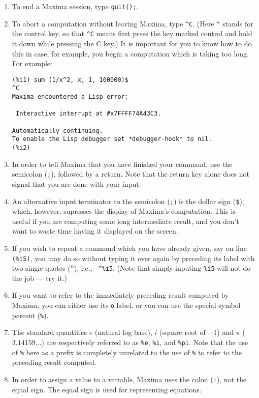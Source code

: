 \documentclass[a4paper,12pt]{article}
\begin{document}
\begin{enumerate}
\item To end a Maxima session, type {\tt quit();}.

\item To abort a computation without leaving Maxima, type \verb+^C+.
(Here \verb+^+ stands for the control key, so
that \verb+^C+ means first press the key marked control and hold it down while pressing the C key.)
It is important for you to
know how to do this in case, for example, you begin a computation which is taking too long.
For example:
\begin{verbatim}
(%i1) sum (1/x^2, x, 1, 100000)$
^C
Maxima encountered a Lisp error:

 Interactive interrupt at #x7FFFF74A43C3.

Automatically continuing.
To enable the Lisp debugger set *debugger-hook* to nil.
(%i2)
\end{verbatim}

\item In order to tell Maxima that you have finished your command, use
  the semicolon ({\tt ;}), followed by a return.  Note that the return
  key alone does not signal that you are done with your input.

\item An alternative input terminator to the semicolon ({\tt ;}) is
  the dollar sign ({\tt \$}), which, however, supresses the display of
  Maxima's computation.  This is useful if you are computing some long
  intermediate result, and you don't want to waste time having it
  displayed on the screen.


\item If you wish to repeat a command which you have already given,
  say on line {\tt (\%i5)}, you may do so without typing it over again
  by preceding its label with two single quotes ({\tt ''}), i.e., {\tt
    ''\%i5}. (Note that simply inputing {\tt \%i5} will not do the job
  --- try it.)

\item If you want to refer to the immediately preceding result
  computed by Maxima, you can either use its {\tt o} label, or you can
  use the special symbol percent ({\tt \%}).

\item The standard quantities $e$ (natural log base), $i$ (square root
  of $-1$) and $\pi$ ($3.14159\ldots$) are respectively referred to as
  \verb+%e+, \verb+%i+,
  and \verb+%pi+.  Note that the use of {\tt \%} here as a prefix
  is completely unrelated to the use of {\tt \%} to refer to the
  preceding result computed.

\item In order to assign a value to a variable, Maxima uses the colon
  ({\tt :}), not the equal sign.  The equal sign is used for
  representing equations.
\end{enumerate}
\end{document}
